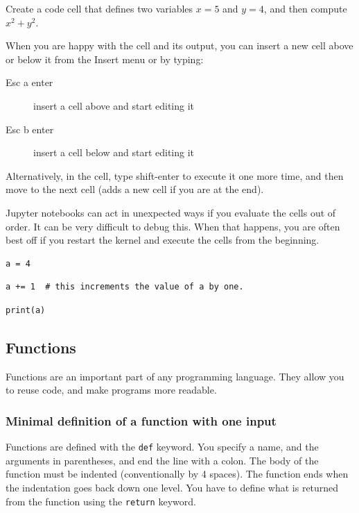 \documentclass[11pt]{article}
\begin{document}
Create a code cell that defines two variables \(x=5\) and \(y=4\), and then compute \(x^2 + y^2\).

When you are happy with the cell and its output, you can insert a new cell above or below it from the Insert menu or by typing:

\begin{description}
\item[{Esc a enter}] insert a cell above and start editing it
\item[{Esc b enter}] insert a cell below and start editing it
\end{description}

Alternatively, in the cell, type shift-enter to execute it one more time, and then move to the next cell (adds a new cell if you are at the end).

Jupyter notebooks can act in unexpected ways if you evaluate the cells out of order. It can be very difficult to debug this. When that happens, you are often best off if you restart the kernel and execute the cells from the beginning.

\begin{verbatim}
a = 4
\end{verbatim}


\begin{verbatim}
a += 1  # this increments the value of a by one.
\end{verbatim}


\begin{verbatim}
print(a)
\end{verbatim}

\subsection{Functions}
\label{sec:org1661fc5}

Functions are an important part of any programming language. They allow you to reuse code, and make programs more readable.

\subsubsection{Minimal definition of a function with one input}
\label{sec:org23c5abe}

Functions are defined with the \texttt{def} keyword. You specify a name, and the arguments in parentheses, and end the line with a colon. The body of the function must be indented (conventionally by 4 spaces). The function ends when the indentation goes back down one level. You have to define what is returned from the function using the \texttt{return} keyword.
\end{document}
